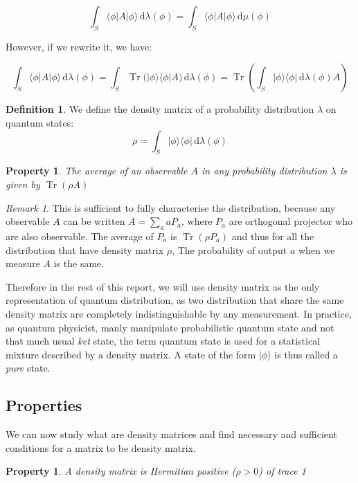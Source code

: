 \documentclass[10pt]{report}
\theoremstyle{plain}
\newtheorem{prop}[thm]{Property}
\theoremstyle{definition}
\newtheorem{defn}{Definition}[chapter]
\theoremstyle{remark}
\newtheorem*{rem}{Remark}
\newcommand{\ket}[1]{|#1\rangle}
\newcommand{\bra}[1]{\langle#1|}
\newcommand{\dd}{\mathrm{d}}
\DeclareMathOperator{\Tr}{Tr}
\begin{document}
\[\int_S \bra \phi A \ket \phi\,\dd \lambda(\phi) = \int_S \bra \phi A \ket
  \phi\,\dd \mu(\phi) \]

However, if we rewrite it, we have:

\[\int_S \bra \phi A \ket \phi\,\dd \lambda(\phi)
  = \int_S \Tr\big(\ket \phi \bra \phi A\big) \,\dd \lambda(\phi)
  = \Tr\left(\int_S \ket \phi \bra \phi \,\dd \lambda(\phi) A \right)\]

\begin{defn} We define the density matrix of a probability distribution $\lambda$ on
  quantum states:
  \[ \rho = \int_S \ket \phi \bra \phi \,\dd\lambda(\phi) \]
\end{defn}
\begin{prop}
  The average of an observable $A$ in any probability distribution $\lambda$ is
  given by $\Tr(\rho A)$
\end{prop}

\begin{rem} This is sufficient to fully characterise the distribution, because
 any observable $A$ can be written $A = \sum_a aP_a$, where $P_a$ are orthogonal
 projector who are also observable. The average of $P_a$ is $\Tr(\rho P_a)$ and
 thus for all the distribution that have density matrix $\rho$, The probability
 of output $a$ when we measure $A$ is the same.
\end{rem}

Therefore in the rest of this report, we will use density matrix as the only
representation of quantum distribution, as two distribution that share the same
density matrix are completely indistinguishable by any measurement. In practice,
as quantum physicist, manly manipulate probabilistic quantum state and not that
much usual \emph{ket} state, the term quantum state is used for a statistical
mixture described by a density matrix. A state of the form $\ket \phi$ is thus
called a \emph{pure} state.

\subsection{Properties}

We can now study what are density matrices and find necessary and sufficient
conditions for a matrix to be density matrix.

\begin{prop}\label{prop:dens}
  A density matrix is Hermitian positive ($\rho > 0$) of trace 1
\end{prop}
\end{document}
